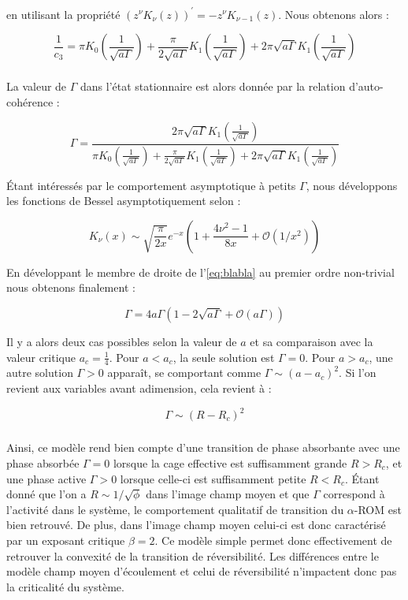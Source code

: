 \noindent en utilisant la propriété $(z^\nu K_\nu (z))^\prime = -z^\nu K_{\nu-1}(z)$. Nous obtenons alors :

\begin{equation}
\frac{1}{c_3} = \pi K_0\left( \frac{1}{\sqrt{a\Gamma}} \right) + \frac{\pi}{2\sqrt{a\Gamma}}K_1\left( \frac{1}{\sqrt{a\Gamma}} \right)+2\pi \sqrt{a\Gamma}K_1\left( \frac{1}{\sqrt{a\Gamma}} \right)
\end{equation}

\subparagraph{}La valeur de $\Gamma$ dans l'état stationnaire est alors donnée par la relation d'auto-cohérence :

\begin{equation}
	\Gamma = \frac{2\pi \sqrt{a\Gamma}K_1\left( \frac{1}{\sqrt{a\Gamma}} \right)}{\pi K_0\left( \frac{1}{\sqrt{a\Gamma}} \right) + \frac{\pi}{2\sqrt{a\Gamma}}K_1\left( \frac{1}{\sqrt{a\Gamma}} \right)+2\pi \sqrt{a\Gamma}K_1\left( \frac{1}{\sqrt{a\Gamma}} \right)}
	\label{eq:blabla}
\end{equation}

\noindent Étant intéressés par le comportement asymptotique à petits $\Gamma$, nous développons les fonctions de Bessel asymptotiquement selon :

\begin{equation}
	K_\nu (x) \sim \sqrt{\frac{\pi}{2x}}e^{-x}\left( 1+\frac{4\nu^2-1}{8x}+\mathcal{O}(1/x^2) \right)
\end{equation}

\noindent En développant le membre de droite de l'\autoref{eq:blabla} au premier ordre non-trivial nous obtenons finalement :

\begin{equation}
	\Gamma = 4a\Gamma\left( 1-2\sqrt{a\Gamma}+\mathcal{O}(a\Gamma) \right)
\end{equation}

\noindent Il y a alors deux cas possibles selon la valeur de $a$ et sa comparaison avec la valeur critique $a_c = \frac{1}{4}$. Pour $a<a_c$, la seule solution est $\Gamma = 0$. Pour $a>a_c$, une autre solution $\Gamma > 0$ apparaît, se comportant comme $\Gamma \sim (a-a_c)^2$. Si l'on revient aux variables avant adimension, cela revient à :

\begin{equation}
	\Gamma \sim (R-R_c)^2
	\label{eq:resolhl2d}
\end{equation}

\subparagraph{}Ainsi, ce modèle rend bien compte d'une transition de phase absorbante avec une phase absorbée $\Gamma = 0$ lorsque la cage effective est suffisamment grande $R>R_c$, et une phase active $\Gamma >0$ lorsque celle-ci est suffisamment petite $R<R_c$. Étant donné que l'on a $R\sim 1/\sqrt{\phi}$ dans l'image champ moyen et que $\Gamma$ correspond à l'activité dans le système, le comportement qualitatif de transition du $\alpha$-ROM est bien retrouvé. De plus, dans l'image champ moyen celui-ci est donc caractérisé par un exposant critique $\beta = 2$. Ce modèle simple permet donc effectivement de retrouver la convexité de la transition de réversibilité. Les différences entre le modèle champ moyen d'écoulement et celui de réversibilité n'impactent donc pas la criticalité du système.

